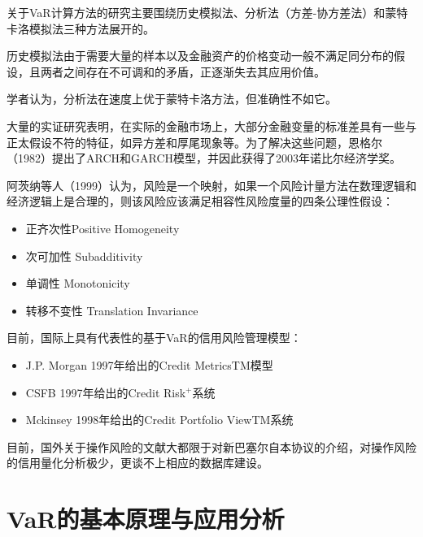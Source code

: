 \documentclass[UTF8]{ctexart}
\begin{document}
关于VaR计算方法的研究主要围绕历史模拟法、分析法（方差-协方差法）和蒙特卡洛模拟法三种方法展开的。

历史模拟法由于需要大量的样本以及金融资产的价格变动一般不满足同分布的假设，且两者之间存在不可调和的矛盾，正逐渐失去其应用价值。

学者认为，分析法在速度上优于蒙特卡洛方法，但准确性不如它。

大量的实证研究表明，在实际的金融市场上，大部分金融变量的标准差具有一些与正太假设不符的特征，如异方差和厚尾现象等。为了解决这些问题，恩格尔（1982）提出了ARCH和GARCH模型，并因此获得了2003年诺比尔经济学奖。

阿茨纳等人（1999）认为，风险是一个映射，如果一个风险计量方法在数理逻辑和经济逻辑上是合理的，则该风险应该满足相容性风险度量的四条公理性假设：
\begin{itemize}
\item 正齐次性Positive Homogeneity
\item 次可加性 Subadditivity
\item 单调性 Monotonicity
\item 转移不变性 Translation Invariance
\end{itemize}

目前，国际上具有代表性的基于VaR的信用风险管理模型：
\begin{itemize}
\item J.P. Morgan 1997年给出的Credit MetricsTM模型
\item CSFB 1997年给出的Credit Risk$^+$系统
\item Mckinsey 1998年给出的Credit Portfolio ViewTM系统
\end{itemize}

目前，国外关于操作风险的文献大都限于对新巴塞尔自本协议的介绍，对操作风险的信用量化分析极少，更谈不上相应的数据库建设。

\section{VaR的基本原理与应用分析}
\end{document}
